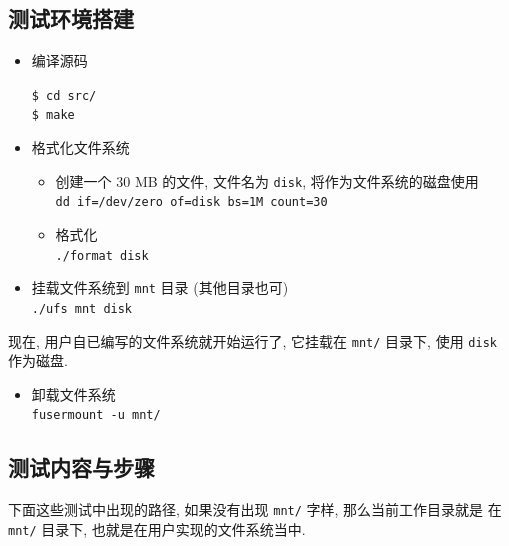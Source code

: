 \documentclass[nofonts, titlepage]{ctexart}
\begin{document}
\subsection{测试环境搭建}\label{ux6d4bux8bd5ux73afux5883ux642dux5efa}

\begin{itemize}
\item
  编译源码

  \texttt{\$ cd src/}\\\texttt{\$ make}
\item
  格式化文件系统
  \begin{itemize}
\item
  创建一个 30 MB 的文件, 文件名为 \texttt{disk},
  将作为文件系统的磁盘使用\\
  \texttt{dd if=/dev/zero of=disk bs=1M count=30}
\item
  格式化\\ \texttt{./format disk}
  \end{itemize}
\item
  挂载文件系统到 \texttt{mnt} 目录 (其他目录也可)\\
  \texttt{./ufs mnt disk}
\end{itemize}

现在, 用户自已编写的文件系统就开始运行了, 它挂载在 \texttt{mnt/} 目录下,
使用 \texttt{disk} 作为磁盘.

\begin{itemize}
\item
  卸载文件系统\\ \texttt{fusermount -u mnt/}
\end{itemize}

\subsection{测试内容与步骤}\label{ux6d4bux8bd5ux5185ux5bb9ux4e0eux6b65ux9aa4}

下面这些测试中出现的路径, 如果没有出现 \texttt{mnt/} 字样,
那么当前工作目录就是 在 \texttt{mnt/} 目录下,
也就是在用户实现的文件系统当中.
\end{document}
